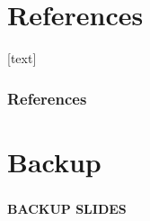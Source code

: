 \documentclass[xcolor=dvipsnames,10pt]{beamer}
\begin{document}
\appendix


\section*{References}
[text]

\begin{frame}[allowframebreaks]
\frametitle{References}\footnotesize

%

\end{frame}


\section*{Backup}

\begin{frame}
 \frametitle{}

\begin{center}{\bfseries
BACKUP SLIDES}
\end{center}
\end{frame}
\end{document}
